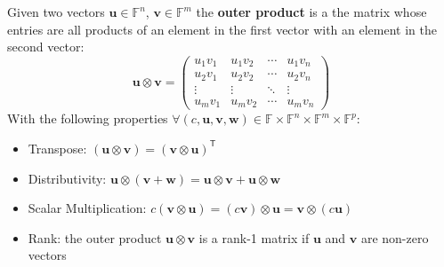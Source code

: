 \documentclass[../lecture-notes.tex]{subfiles}
\begin{document}
\begin{definition}
    Given two vectors $\mathbf{u} \in \mathbb{F}^n$, $\mathbf{v} \in \mathbb{F}^m$ the \textbf{outer product} is a
    the matrix whose entries are all products of an element in the first vector with an element 
    in the second vector:
    \begin{equation*}
        \mathbf{u} \otimes \mathbf{v} = \begin{pmatrix}
            u_1 v_1 & u_1 v_2 & \cdots & u_1 v_n \\
            u_2 v_1 & u_2 v_2 & \cdots & u_2 v_n \\
            \vdots & \vdots & \ddots & \vdots \\
            u_m v_1 & u_m v_2 & \cdots & u_m v_n
        \end{pmatrix}
    \end{equation*}
    With the following properties $\forall (c, \mathbf{u}, \mathbf{v}, \mathbf{w}) \in \mathbb{F} \times \mathbb{F}^n \times \mathbb{F}^m \times \mathbb{F}^p$:
    \begin{itemize}
        \item Transpose: $(\mathbf{u} \otimes \mathbf{v}) = (\mathbf{v} \otimes \mathbf{u})^{\textsf{T}}$
        \item Distributivity: $\mathbf{u} \otimes (\mathbf{v} + \mathbf{w}) = \mathbf{u} \otimes \mathbf{v} + \mathbf{u} \otimes \mathbf{w}$
        \item Scalar Multiplication: $c(\mathbf{v} \otimes \mathbf{u}) = (c\mathbf{v}) \otimes \mathbf{u} = \mathbf{v} \otimes (c\mathbf{u})$
        \item Rank: the outer product $\mathbf{u} \otimes \mathbf{v}$ is a rank-1 matrix if $\mathbf{u}$ and $\mathbf{v}$ are non-zero
        vectors
    \end{itemize}
\end{definition}
\end{document}
